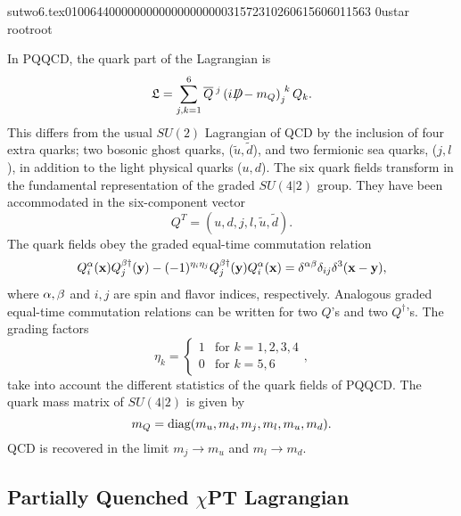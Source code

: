                                                                                                                                                                                                                                                                                      sutwo6.tex                                                                                          0100644 0000000 0000000 00000315723 10260615606 011563  0                                                                                                    ustar   root                            root                                                                                                                                                                                                                   \documentclass[prd,amssymb,amsmath,showpacs,nofootinbib,superscriptaddress]{revtex4}
\begin{document}
In PQQCD, the quark part of the Lagrangian is
\begin{equation}
\mathfrak{L} = \sum_{j,k=1}^6 {\overline{Q}}{}^{\hskip 0.2em j} \left(
  iD\hskip-0.65em / - m_Q \right)_j^{\hskip 0.3em k} Q_k
.\label{eq:pqqcdlag}
\end{equation}
This differs from the usual $SU(2)$ Lagrangian of QCD by the
inclusion of four extra quarks; two bosonic ghost quarks, ($\tilde u,
\tilde d$), and two fermionic sea quarks, ($j, l$), in addition
to the light physical quarks ($u, d$).  The
six quark fields transform in the fundamental representation of the
graded $SU(4|2)$ group.  They have been accommodated in the six-component vector
%
\begin{equation}
  Q^T = (u, d, j, l, \tilde{u}, \tilde{d})
.\end{equation}
The quark fields obey the graded equal-time commutation relation
\begin{equation}
Q^{\alpha}_i(\mathbf x) Q^{\beta \dagger}_j(\mathbf y) -
(-1)^{\eta_i \eta_j} Q^{{\beta} \dagger}_j(\mathbf y) Q^{\alpha}_i(\mathbf x) =
{\delta}^{{\alpha} {\beta}} {\delta}_{ij} {\delta}^3 (\mathbf {x-y}),
\end{equation}
where ${\alpha}, \beta$ and $i,j$ are spin and flavor indices, respectively.
Analogous graded equal-time commutation relations can be written for
two $Q$'s and two $Q^\dagger$'s.  The grading factors
\begin{equation}
   \eta_k
   = \left\{ 
       \begin{array}{cl}
         1 & \text{for } k=1,2,3,4 \\
         0 & \text{for } k=5,6
       \end{array} 
     \right. ,
\end{equation}
take into account the different statistics 
of the quark fields of PQQCD.  The quark mass matrix of
$SU(4|2)$ is given by
\begin{equation}
  m_Q = \text{diag}(m_u, m_d, m_j, m_l, m_u, m_d).
\end{equation}
QCD is recovered in the limit $m_j \rightarrow m_u$ and $m_l \rightarrow m_d$.


%
%
%
%
%
%
%
%
%
%
%
%
\subsection{Partially Quenched $\chi$PT Lagrangian}
\end{document}
